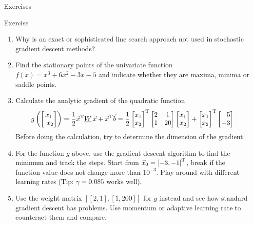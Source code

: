   \begin{frame}{Exercises}
    \begin{exampleblock}{Exercise}
      \begin{enumerate}
        \item Why is an exact or sophisticated line search approach not used in stochastic gradient descent methods?
        \item Find the stationary points of the univariate function $f(x) = x^3 + 6x^2 - 3x - 5$ and indicate whether they are maxima, minima or saddle points.
        \item Calculate the analytic gradient of the quadratic function
          \begin{equation*}
            g\left( \begin{bmatrix}x_1 \\ x_2 \end{bmatrix} \right)
            = \frac{1}{2}
              \vec{x}^\transp \underline{W}\, \vec{x} + \vec{x}^\transp \vec{b}
            = \frac{1}{2}
              \begin{bmatrix} x_1 \\ x_2 \end{bmatrix}^\transp
              \begin{bmatrix} 2 & 1 \\ 1 & 20 \end{bmatrix}
              \begin{bmatrix} x_1 \\ x_2 \end{bmatrix}
              + \begin{bmatrix} x_1 \\ x_2 \end{bmatrix}^\transp
                \begin{bmatrix} -5 \\ -3 \end{bmatrix}
          \end{equation*}
          Before doing the calculation, try to determine the dimension of the gradient.
        \item For the function $g$ above, use the gradient descent algorithm to find the minimum and track the steps. Start from $\vec{x}_0 = \left[-3, -1\right]^{\text{T}}$, break if the function value does not change more than $10^{-3}$.
        Play around with different learning rates (Tip: $\gamma = 0.085$ works well).
        \item Use the weight matrix $[[2, 1], [1, 200]]$ for $g$ instead and see how standard gradient descent has problems. Use momentum or adaptive learning rate to counteract them and compare.
      \end{enumerate}
    \end{exampleblock}
  \end{frame}


